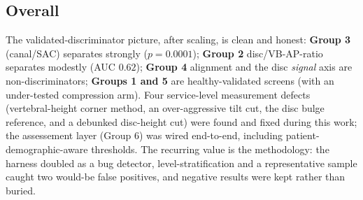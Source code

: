 \subsection{Overall}
The validated-discriminator picture, after scaling, is clean and honest: \textbf{Group 3} (canal/SAC)
separates strongly ($p=0.0001$); \textbf{Group 2} disc/VB-AP-ratio separates modestly (AUC $0.62$);
\textbf{Group 4} alignment and the disc \emph{signal} axis are non-discriminators; \textbf{Groups 1 and 5}
are healthy-validated screens (with an under-tested compression arm). Four service-level measurement
defects (vertebral-height corner method, an over-aggressive tilt cut, the disc bulge reference, and a
debunked disc-height cut) were found and fixed during this work; the assessement layer (Group 6) was
wired end-to-end, including patient-demographic-aware thresholds. The recurring value is the methodology:
the harness doubled as a bug detector, level-stratification and a representative sample caught two
would-be false positives, and negative results were kept rather than buried.
